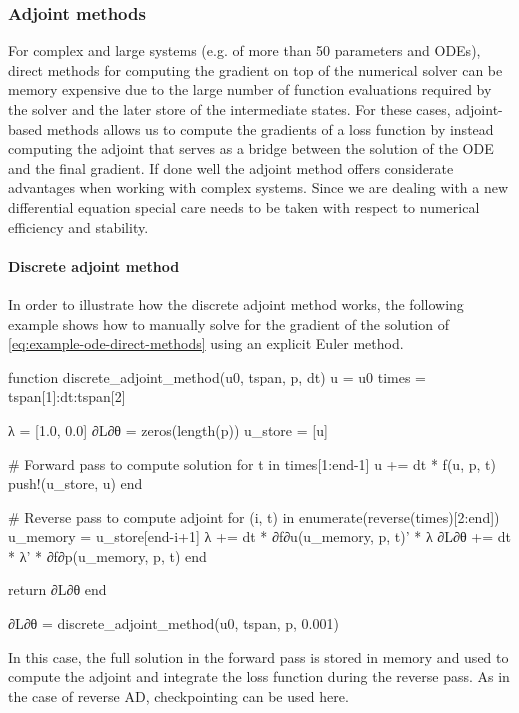 \subsubsection{Adjoint methods}
\label{section:computing-adjoints}

For complex and large systems (e.g. of more than 50 parameters and ODEs), direct methods for computing the gradient on top of the numerical solver can be memory expensive due to the large number of function evaluations required by the solver and the later store of the intermediate states. 
For these cases, adjoint-based methods allows us to compute the gradients of a loss function by instead computing the adjoint that serves as a bridge between the solution of the ODE and the final gradient. 
If done well the adjoint method offers considerate advantages when working with complex systems.
Since we are dealing with a new differential equation special care needs to be taken with respect to numerical efficiency and stability.

\paragraph{Discrete adjoint method}

In order to illustrate how the discrete adjoint method works, the following example shows how to manually solve for the gradient of the solution of \eqref{eq:example-ode-direct-methods} using an explicit Euler method. 
\begin{jllisting}
function discrete_adjoint_method(u0, tspan, p, dt)
    u = u0
    times = tspan[1]:dt:tspan[2]

    λ = [1.0, 0.0]
    ∂L∂θ = zeros(length(p))
    u_store = [u]

    # Forward pass to compute solution
    for t in times[1:end-1]
        u += dt * f(u, p, t)
        push!(u_store, u)
    end

    # Reverse pass to compute adjoint
    for (i, t) in enumerate(reverse(times)[2:end])
        u_memory = u_store[end-i+1]
        λ += dt * ∂f∂u(u_memory, p, t)' * λ
        ∂L∂θ += dt * λ' * ∂f∂p(u_memory, p, t)
    end

    return ∂L∂θ
end

∂L∂θ = discrete_adjoint_method(u0, tspan, p, 0.001) 
\end{jllisting}
In this case, the full solution in the forward pass is stored in memory and used to compute the adjoint and integrate the loss function during the reverse pass. 
As in the case of reverse AD, checkpointing can be used here. 

